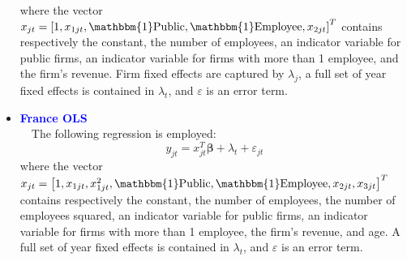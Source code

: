 \documentclass[12pt,notitlepage]{article}
\newcommand{\sym}[1] {\ifmmode^{#1} \else\(^{#1}\) \fi}
\begin{document}
\begin{itemize}
\begin{equation}
	\end{equation}
where the vector $x_{jt} = \left[  1, x_{1jt}, \mathbbm{1}\text{Public}, \mathbbm{1}\text{Employee}, x_{2jt} \right]^{T} $ contains respectively the constant, the number of employees, an indicator variable for public firms, an indicator variable for firms with more than 1 employee, and the firm's revenue. Firm fixed effects are captured by $\lambda_{j}$, a full set of year fixed effects is contained in $\lambda_{t}$, and $\varepsilon$ is an error term.
\begin{table}[htbp]\centering
\def\sym#1{\ifmmode^{#1}\else\(^{#1}\)\fi}
\caption{Haltiwanger growth rate}
\end{table}
\clearpage



\item \textcolor{blue}{\textbf{France OLS}}\\~\
The following regression is employed:
	\begin{equation}
	y_{jt} = x^{T}_{jt}\mathbf{\beta} + \lambda_{t} + \varepsilon_{jt}
	\end{equation}
where the vector $x_{jt} = \left[  1, x_{1jt}, x^{2}_{1jt}, \mathbbm{1}\text{Public}, \mathbbm{1}\text{Employee}, x_{2jt}, x_{3jt}  \right]^{T} $ contains respectively the constant, the number of employees, the number of employees squared, an indicator variable for public firms, an indicator variable for firms with more than 1 employee, the firm's revenue, and age. A full set of year fixed effects is contained in $\lambda_{t}$, and $\varepsilon$ is an error term.
\begin{table}[htbp]\centering
\def\sym#1{\ifmmode^{#1}\else\(^{#1}\)\fi}
\caption{Haltiwanger growth rate}
\end{table}
\clearpage


\end{itemize}
\end{document}
